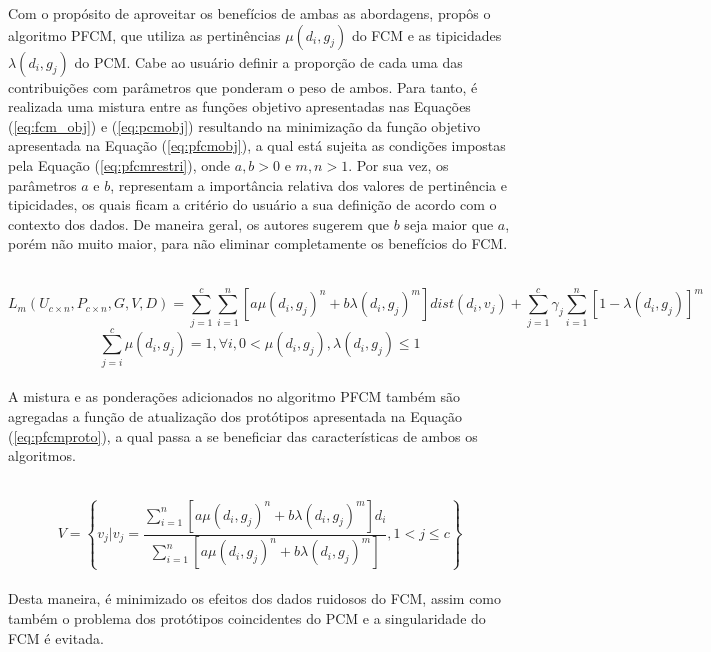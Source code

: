 Com o propósito de aproveitar os benefícios de ambas as abordagens,  propôs o
algoritmo PFCM, que utiliza as pertinências $\mu(d_i,g_j)$ do FCM e as tipicidades
$\lambda(d_i,g_j)$ do PCM. Cabe ao usuário definir a proporção de cada uma das contribuições com
parâmetros que ponderam o peso de ambos. Para tanto, é realizada uma mistura entre as funções
objetivo apresentadas nas Equações (\ref{eq:fcm_obj}) e (\ref{eq:pcmobj}) resultando na minimização
da função objetivo apresentada na Equação (\ref{eq:pfcmobj}), a qual está sujeita as condições
impostas pela Equação (\ref{eq:pfcmrestri}), onde $a,b > 0$ e $m,n > 1$. Por sua vez, os parâmetros
$a$ e $b$, representam a importância relativa dos valores de pertinência e tipicidades, os quais
ficam a critério do usuário a sua definição de acordo com o contexto dos dados. De maneira geral, os
autores sugerem que $b$ seja maior que $a$, porém não muito maior, para não eliminar completamente
os benefícios do FCM. 

\leavevmode\\
\begin{equation}
  L_m(U_{c \times n},P_{c \times n},G,V,D) = \sum_{j=1}^c 
  \sum_{i=1}^n [a\mu(d_i,g_j)^n + b\lambda(d_i, g_j)^m] dist(d_i, v_j) +
  \sum_{j=1}^c \gamma_j \sum_{i=1}^n [1 - \lambda(d_i, g_j)]^m
  \label{eq:pfcmobj}
\end{equation}
\begin{equation}
  \sum_{j=i}^c \mu(d_i,g_j) = 1, \forall i, 0 < \mu(d_i,g_j),\lambda(d_i,g_j) \leq 1
  \label{eq:pfcmrestri}
\end{equation}
\leavevmode\\

A mistura e as ponderações adicionados no algoritmo PFCM também são agregadas a função de
atualização dos protótipos apresentada na Equação (\ref{eq:pfcmproto}), a qual passa a se beneficiar
das características de ambos os algoritmos.  

\leavevmode\\
\begin{equation}
  V = \left\{ v_j | v_j = \frac{\sum_{i=1}^n[a\mu(d_i,g_j)^n + b\lambda(d_i, g_j)^m] d_i}
    {\sum_{i=1}^n[a\mu(d_i,g_j)^n + b\lambda(d_i, g_j)^m]}, 
  1 < j \leq c \right\} 
  \label{eq:pfcmproto}
\end{equation}
\leavevmode\\

Desta maneira, é minimizado os efeitos dos dados ruidosos do FCM, assim como também o problema
dos protótipos coincidentes do PCM e a singularidade do FCM é evitada. 

